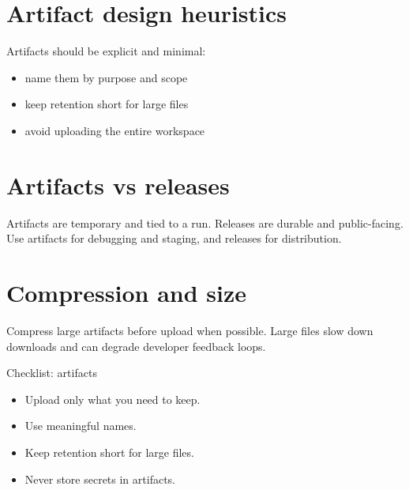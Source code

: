 \section{Artifact design heuristics}
Artifacts should be explicit and minimal:
\begin{itemize}[nosep]
  \item name them by purpose and scope
  \item keep retention short for large files
  \item avoid uploading the entire workspace
\end{itemize}

\section{Artifacts vs releases}
Artifacts are temporary and tied to a run.
Releases are durable and public-facing.
Use artifacts for debugging and staging, and releases for distribution.

\section{Compression and size}
Compress large artifacts before upload when possible.
Large files slow down downloads and can degrade developer feedback loops.

\begin{checklistbox}{Checklist: artifacts}
\begin{itemize}[nosep]
  \item Upload only what you need to keep.
  \item Use meaningful names.
  \item Keep retention short for large files.
  \item Never store secrets in artifacts.
\end{itemize}
\end{checklistbox}

